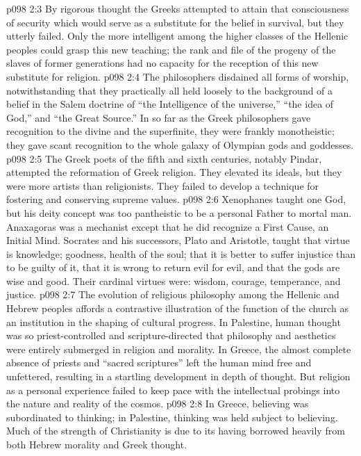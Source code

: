 \vs p098 2:3 By rigorous thought the Greeks attempted to attain that consciousness of security which would serve as a substitute for the belief in survival, but they utterly failed. Only the more intelligent among the higher classes of the Hellenic peoples could grasp this new teaching; the rank and file of the progeny of the slaves of former generations had no capacity for the reception of this new substitute for religion.
\pc \vs p098 2:4 The philosophers disdained all forms of worship, notwithstanding that they practically all held loosely to the background of a belief in the Salem doctrine of “the Intelligence of the universe,” “the idea of God,” and “the Great Source.” In so far as the Greek philosophers gave recognition to the divine and the superfinite, they were frankly monotheistic; they gave scant recognition to the whole galaxy of Olympian gods and goddesses.
\vs p098 2:5 The Greek poets of the fifth and sixth centuries, notably Pindar, attempted the reformation of Greek religion. They elevated its ideals, but they were more artists than religionists. They failed to develop a technique for fostering and conserving supreme values.
\vs p098 2:6 Xenophanes taught one God, but his deity concept was too pantheistic to be a personal Father to mortal man. Anaxagoras was a mechanist except that he did recognize a First Cause, an Initial Mind. Socrates and his successors, Plato and Aristotle, taught that virtue is knowledge; goodness, health of the soul; that it is better to suffer injustice than to be guilty of it, that it is wrong to return evil for evil, and that the gods are wise and good. Their cardinal virtues were: wisdom, courage, temperance, and justice.
\pc \vs p098 2:7 The evolution of religious philosophy among the Hellenic and Hebrew peoples affords a contrastive illustration of the function of the church as an institution in the shaping of cultural progress. In Palestine, human thought was so priest\hyp{}controlled and scripture\hyp{}directed that philosophy and aesthetics were entirely submerged in religion and morality. In Greece, the almost complete absence of priests and “sacred scriptures” left the human mind free and unfettered, resulting in a startling development in depth of thought. But religion as a personal experience failed to keep pace with the intellectual probings into the nature and reality of the cosmos.\plusone
\vs p098 2:8 In Greece, believing was subordinated to thinking; in Palestine, thinking was held subject to believing. Much of the strength of Christianity is due to its having borrowed heavily from both Hebrew morality and Greek thought.
